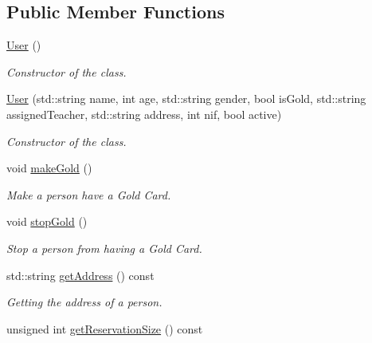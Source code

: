 \subsection*{Public Member Functions}
\begin{DoxyCompactItemize}
\item 
\mbox{\label{class_user_a4a0137053e591fbb79d9057dd7d2283d}} 
\mbox{\hyperlink{class_user_a4a0137053e591fbb79d9057dd7d2283d}{User}} ()
\begin{DoxyCompactList}\small\item\em Constructor of the class. \end{DoxyCompactList}\item 
\mbox{\hyperlink{class_user_a26dacc0c7b6de0809db02d76a81cddbf}{User}} (std\+::string name, int age, std\+::string gender, bool is\+Gold, std\+::string assigned\+Teacher, std\+::string address, int nif, bool active)
\begin{DoxyCompactList}\small\item\em Constructor of the class. \end{DoxyCompactList}\item 
\mbox{\label{class_user_a1ddb4cbabc84ef92ac92bfe6f9385d39}} 
void \mbox{\hyperlink{class_user_a1ddb4cbabc84ef92ac92bfe6f9385d39}{make\+Gold}} ()
\begin{DoxyCompactList}\small\item\em Make a person have a Gold Card. \end{DoxyCompactList}\item 
\mbox{\label{class_user_a88a8b41f134b21aeb702c481ffee0ef4}} 
void \mbox{\hyperlink{class_user_a88a8b41f134b21aeb702c481ffee0ef4}{stop\+Gold}} ()
\begin{DoxyCompactList}\small\item\em Stop a person from having a Gold Card. \end{DoxyCompactList}\item 
std\+::string \mbox{\hyperlink{class_user_aef1759300db1bca3c84af6af79f00365}{get\+Address}} () const
\begin{DoxyCompactList}\small\item\em Getting the address of a person. \end{DoxyCompactList}\item 
unsigned int \mbox{\hyperlink{class_user_ad87b45e028489ed785fa82a4c9fc6739}{get\+Reservation\+Size}} () const

\end{DoxyCompactItemize}

